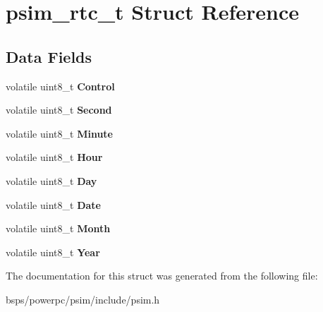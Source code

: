\hypertarget{structpsim__rtc__t}{}\section{psim\+\_\+rtc\+\_\+t Struct Reference}
\label{structpsim__rtc__t}
\subsection*{Data Fields}
\begin{DoxyCompactItemize}
\item 
\mbox{\label{structpsim__rtc__t_a69c6d27ef5b5422b6c50a891ab8743b2}} 
volatile uint8\+\_\+t {\bfseries Control}
\item 
\mbox{\label{structpsim__rtc__t_a33de95409db9449443703e9a9a0e40b1}} 
volatile uint8\+\_\+t {\bfseries Second}
\item 
\mbox{\label{structpsim__rtc__t_ac6639f2a83613dd7adf616e31ec0d42d}} 
volatile uint8\+\_\+t {\bfseries Minute}
\item 
\mbox{\label{structpsim__rtc__t_a9795fc25fa9255e0feb39b77b44cfc54}} 
volatile uint8\+\_\+t {\bfseries Hour}
\item 
\mbox{\label{structpsim__rtc__t_ad024cb5df3b8270bbfb3837622cc3703}} 
volatile uint8\+\_\+t {\bfseries Day}
\item 
\mbox{\label{structpsim__rtc__t_a72054078afba1319c7236831a10a20b1}} 
volatile uint8\+\_\+t {\bfseries Date}
\item 
\mbox{\label{structpsim__rtc__t_ac7f63251d644316d16486459c82efde7}} 
volatile uint8\+\_\+t {\bfseries Month}
\item 
\mbox{\label{structpsim__rtc__t_aba6a2b44c238856df2168535d6abce91}} 
volatile uint8\+\_\+t {\bfseries Year}
\end{DoxyCompactItemize}


The documentation for this struct was generated from the following file\+:\begin{DoxyCompactItemize}
\item 
bsps/powerpc/psim/include/psim.\+h\end{DoxyCompactItemize}
